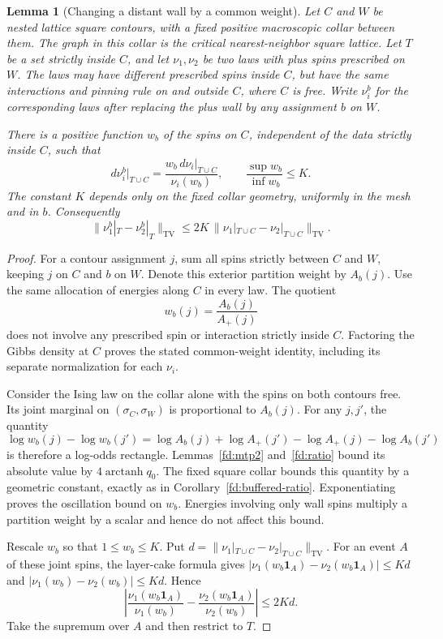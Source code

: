 \documentclass[11pt]{article}
\newtheorem{lemma}[theorem]{Lemma}
\theoremstyle{definition}
\theoremstyle{remark}
\numberwithin{equation}{section}
\begin{document}
\begin{lemma}[Changing a distant wall by a common weight]
\label{fd:outer-wall-weight}
Let $C$ and $W$ be nested lattice square contours, with a fixed positive
macroscopic collar between them. The graph in this collar is the critical
nearest-neighbor square lattice. Let $T$ be a set strictly inside $C$,
and let $\nu_1,\nu_2$ be two laws with plus spins prescribed on $W$.
The laws may have different prescribed spins inside $C$, but have the
same interactions and pinning rule on and outside $C$, where $C$ is free.
Write $\nu_i^b$ for the corresponding laws after replacing the plus wall
by any assignment $b$ on $W$.

There is a positive function $w_b$ of the spins on $C$, independent of
the data strictly inside $C$, such that
\[
 d\nu_i^b\big|_{T\cup C}
 =\frac{w_b\,d\nu_i\big|_{T\cup C}}{\nu_i(w_b)},
 \qquad
 \frac{\sup w_b}{\inf w_b}\le K.
\]
The constant $K$ depends only on the fixed collar geometry, uniformly
in the mesh and in $b$. Consequently
\[
 \|\nu_1^b|_T-\nu_2^b|_T\|_{\mathrm{TV}}
 \le 2K\,
 \|\nu_1|_{T\cup C}-\nu_2|_{T\cup C}\|_{\mathrm{TV}}.
\]
\end{lemma}

\begin{proof}
For a contour assignment $j$, sum all spins strictly between $C$ and
$W$, keeping $j$ on $C$ and $b$ on $W$. Denote this exterior partition
weight by $A_b(j)$. Use the same allocation of energies along $C$ in
every law. The quotient
\[
                       w_b(j)=\frac{A_b(j)}{A_+(j)}
\]
does not involve any prescribed spin or interaction strictly inside
$C$. Factoring the Gibbs density at $C$ proves the stated common-weight
identity, including its separate normalization for each $\nu_i$.

Consider the Ising law on the collar alone with the spins on both
contours free. Its joint marginal on $(\sigma_C,\sigma_W)$ is
proportional to $A_b(j)$. For any $j,j'$, the quantity
\[
 \log w_b(j)-\log w_b(j')
 =\log A_b(j)+\log A_+(j')
  -\log A_+(j)-\log A_b(j')
\]
is therefore a log-odds rectangle. Lemmas~\ref{fd:mtp2}
and~\ref{fd:ratio} bound its absolute value by
$4\operatorname{arctanh}q_0$. The fixed square collar bounds this
quantity by a geometric constant, exactly as in
Corollary~\ref{fd:buffered-ratio}. Exponentiating proves the oscillation
bound on $w_b$. Energies involving only wall spins multiply a partition
weight by a scalar and hence do not affect this bound.

Rescale $w_b$ so that $1\le w_b\le K$. Put
$d=\|\nu_1|_{T\cup C}-\nu_2|_{T\cup C}\|_{\mathrm{TV}}$.
For an event $A$ of these joint spins, the layer-cake formula gives
$|\nu_1(w_b\mathbf1_A)-\nu_2(w_b\mathbf1_A)|\le Kd$ and
$|\nu_1(w_b)-\nu_2(w_b)|\le Kd$. Hence
\[
 \left|
 \frac{\nu_1(w_b\mathbf1_A)}{\nu_1(w_b)}
 -\frac{\nu_2(w_b\mathbf1_A)}{\nu_2(w_b)}
 \right|\le 2Kd.
\]
Take the supremum over $A$ and then restrict to $T$.
\end{proof}
\end{document}
